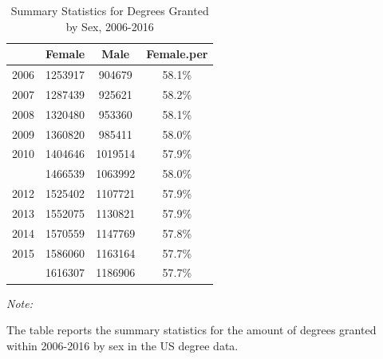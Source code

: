 \documentclass[
  12pt,
]{article}
\begin{document}
\begin{table}[H]

\caption{\label{tab:unnamed-chunk-10}Summary Statistics for Degrees Granted by Sex, 2006-2016}
\centering
\begin{threeparttable}
\begin{tabular}[t]{llcc}
\toprule
  & Female & Male & Female.per\\
\midrule
2006 & 1253917 & 904679 & 58.1\%\\
2007 & 1287439 & 925621 & 58.2\%\\
2008 & 1320480 & 953360 & 58.1\%\\
2009 & 1360820 & 985411 & 58.0\%\\
2010 & 1404646 & 1019514 & 57.9\%\\
\addlinespace
2011 & 1466539 & 1063992 & 58.0\%\\
2012 & 1525402 & 1107721 & 57.9\%\\
2013 & 1552075 & 1130821 & 57.9\%\\
2014 & 1570559 & 1147769 & 57.8\%\\
2015 & 1586060 & 1163164 & 57.7\%\\
\addlinespace
2016 & 1616307 & 1186906 & 57.7\%\\
\bottomrule
\end{tabular}
\begin{tablenotes}
\item \textit{Note: } 
\item The table reports the summary statistics for the amount of degrees granted within 2006-2016 by sex in the US degree data.
\end{tablenotes}
\end{threeparttable}
\end{table}
\end{document}
